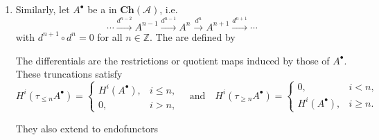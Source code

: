 \begin{definition}
\begin{enumerate}
    called the . They are natural in both $A_\bullet$ and $n$, and fit into canonical morphisms of complexes
    $$
    \tau_{\ge n} A_\bullet \longrightarrow A_\bullet \longrightarrow \tau_{\le n} A_\bullet.
    $$

    \item 
    \noindent
    Similarly, let $A^\bullet$ be a 
    in $\mathbf{Ch}(\mathcal{A})$, i.e.
    $$
    \cdots \xrightarrow{d^{n-2}} A^{n-1} \xrightarrow{d^{n-1}} A^n \xrightarrow{d^n} A^{n+1} \xrightarrow{d^{n+1}} \cdots
    $$
    with $d^{n+1} \circ d^n = 0$ for all $n \in \mathbb{Z}$. 
    The  are defined by


    The differentials are the restrictions or quotient maps induced by those of $A^\bullet$. 
    These truncations satisfy
    $$
    H^i(\tau_{\le n} A^\bullet) = 
    \begin{cases}
        H^i(A^\bullet), & i \le n, \\
        0, & i > n,
    \end{cases}
    \quad\text{and}\quad
    H^i(\tau_{\ge n} A^\bullet) = 
    \begin{cases}
        0, & i < n, \\
        H^i(A^\bullet), & i \ge n.
    \end{cases}
    $$

    They also extend to endofunctors



\end{enumerate}
\end{definition}
